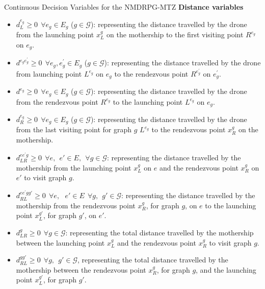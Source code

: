 \documentclass[slidestop,usepdftitle=false,10pt]{beamer}
\begin{document}
    \begin{frame}{Continuous Decision Variables for the NMDRPG-MTZ}
    \textbf{Distance variables}
    \begin{itemize}
        \scriptsize
        \item $d_L^{e_g} \geq 0 \:\: \forall e_g \in E_g$ ($g \in \mathcal{G}$): representing the distance travelled by the drone from the launching point
         $x_L^g$ on the mothership to the first visiting point $R^{e_g}$ on $e_g$.
        \item $d^{e_ge^\prime_g} \geq 0 \:\: \forall e_g, e^\prime_g \in E_g $ ($g \in \mathcal{G}$): representing the distance travelled by the drone from launching point $L^{e_g}$
         on $e_g$ to the rendezvous point $R^{e^\prime_g}$ on $e^\prime_g$.
        \item $d^{e_g} \geq 0 \:\: \forall e_g \in E_g$ ($g \in \mathcal{G}$): representing the distance travelled by the drone from the rendezvous point 
         $R^{e_g}$ to the launching point $L^{e_g}$ on $e_g$. 
        \item $d_R^{e_g} \geq 0 \:\: \forall e_g \in E_g$ ($g \in \mathcal{G}$): representing the distance travelled by the drone from the last visiting point 
         for graph $g$ $L^{e_g}$ to the rendezvous point $x_R^g$ on the mothership.
        \item $d_{LR}^{e e^{\prime}g} \geq 0 \:\: \forall e,\:\: e' \in E, \:\: \forall g \in \mathcal{G}$: representing the distance travelled by the mothership from the launching 
         point $x_L^g$ on $e$ and the rendezvous point $x_R^g$ on $e'$ to visit graph $g$.
        \item $d_{RL}^{e e^{\prime}g g'} \geq 0 \:\: \forall e,\:\:\ e' \in E \:\: \forall g,\:\: g' \in \mathcal{G}$: representing the distance travelled by the mothership from the 
         rendezvous point $x_R^g$, for graph $g$, on $e$ to the launching point $x_L^{g'}$, for graph $g'$, on $e'$.
        \item  $d^{g}_{LR} \geq 0 \:\: \forall g \in \mathcal{G}$: representing the total distance
        travelled by the mothership between the launching point 
         $x_L^g$ and the rendezvous point $x_R^g$ to visit graph $g$.
        \item $d^{gg'}_{RL}\geq 0 \:\: \forall g, \:\: g' \in \mathcal{G}$, representing the total distance travelled by the mothership between the rendezvous
         point $x_R^g$, for graph $g$, and the launching point $x_L^{g'}$, for graph $g'$.
    \end{itemize}
	\end{frame}
\end{document}
